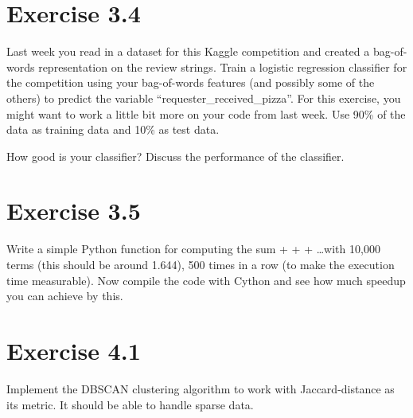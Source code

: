 \documentclass{article}
\begin{document}
\section{Exercise 3.4}
Last week you read in a dataset for this Kaggle competition and created a bag-of-words representation on the review strings. Train a logistic regression classifier for the competition using your bag-of-words features (and possibly some of the others) to predict the variable “requester_received_pizza”. For this exercise, you might want to work a little bit more on your code from last week. Use 90\% of the data as training data and 10\% as test data.

How good is your classifier? Discuss the performance of the classifier.


\section{Exercise 3.5}
Write a simple Python function for computing the sum  +  +  + \ldots with 10,000 terms (this should be around 1.644), 500 times in a row (to make the execution time measurable). Now compile the code with Cython and see how much speedup you can achieve by this.



\section{Exercise 4.1}
Implement the DBSCAN clustering algorithm to work with Jaccard-distance as its metric. It should be able to handle sparse data.


\end{document}
